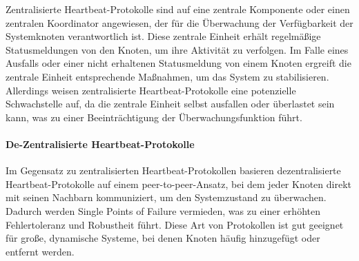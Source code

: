 \documentclass[../vs-script-first-v01.tex]{subfiles}
\begin{document}
Zentralisierte Heartbeat-Protokolle sind auf eine zentrale Komponente oder einen zentralen Koordinator angewiesen, der für die Überwachung der Verfügbarkeit der Systemknoten verantwortlich ist. Diese zentrale Einheit erhält regelmäßige Statusmeldungen von den Knoten, um ihre Aktivität zu verfolgen. Im Falle eines Ausfalls oder einer nicht erhaltenen Statusmeldung von einem Knoten ergreift die zentrale Einheit entsprechende Maßnahmen, um das System zu stabilisieren. Allerdings weisen zentralisierte Heartbeat-Protokolle eine potenzielle Schwachstelle auf, da die zentrale Einheit selbst ausfallen oder überlastet sein kann, was zu einer Beeinträchtigung der Überwachungsfunktion führt.
\paragraph{De-Zentralisierte Heartbeat-Protokolle }\mbox\\
Im Gegensatz zu zentralisierten Heartbeat-Protokollen basieren dezentralisierte Heartbeat-Protokolle auf einem peer-to-peer-Ansatz, bei dem jeder Knoten direkt mit seinen Nachbarn kommuniziert, um den Systemzustand zu überwachen. Dadurch werden Single Points of Failure vermieden, was zu einer erhöhten Fehlertoleranz und Robustheit führt. Diese Art von Protokollen ist gut geeignet für große, dynamische Systeme, bei denen Knoten häufig hinzugefügt oder entfernt werden.

\end{document}
